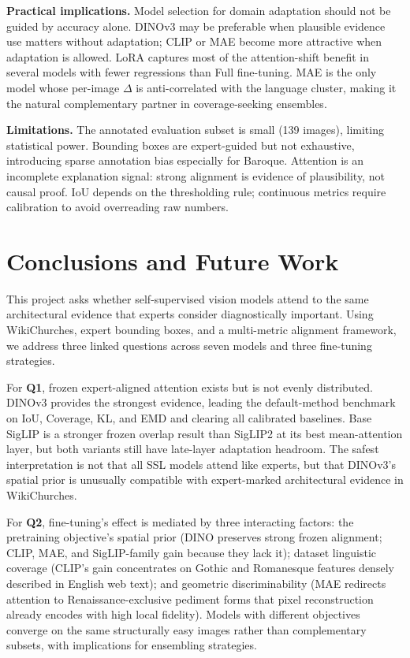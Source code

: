 \documentclass{article}
\begin{document}
\textbf{Practical implications.} Model selection for domain adaptation should
not be guided by accuracy alone. DINOv3 may be preferable when plausible
evidence use matters without adaptation; CLIP or MAE become more attractive when
adaptation is allowed. LoRA captures most of the attention-shift benefit in
several models with fewer regressions than Full fine-tuning. MAE is the only
model whose per-image $\Delta$ is anti-correlated with the language cluster,
making it the natural complementary partner in coverage-seeking ensembles.

\textbf{Limitations.} The annotated evaluation subset is small (139 images),
limiting statistical power. Bounding boxes are expert-guided but not exhaustive,
introducing sparse annotation bias especially for Baroque. Attention is an
incomplete explanation signal: strong alignment is evidence of plausibility, not
causal proof. IoU depends on the thresholding rule; continuous metrics require
calibration to avoid overreading raw numbers.

\section{Conclusions and Future Work}
\label{sec:conc}

This project asks whether self-supervised vision models attend to the same
architectural evidence that experts consider diagnostically important. Using
WikiChurches, expert bounding boxes, and a multi-metric alignment framework, we
address three linked questions across seven models and three fine-tuning
strategies.

For \textbf{Q1}, frozen expert-aligned attention exists but is not evenly
distributed. DINOv3 provides the strongest evidence, leading the default-method
benchmark on IoU, Coverage, KL, and EMD and clearing all calibrated baselines.
Base SigLIP is a stronger frozen overlap result than SigLIP2 at its best
mean-attention layer, but both variants still have late-layer adaptation
headroom. The safest interpretation is not that all SSL models attend like
experts, but that DINOv3's spatial prior is unusually compatible with
expert-marked architectural evidence in WikiChurches.

For \textbf{Q2}, fine-tuning's effect is mediated by three interacting factors:
the pretraining objective's spatial prior (DINO preserves strong frozen
alignment; CLIP, MAE, and SigLIP-family gain because they lack it); dataset
linguistic coverage (CLIP's gain concentrates on Gothic and Romanesque features
densely described in English web text); and geometric discriminability (MAE
redirects attention to Renaissance-exclusive pediment forms that pixel
reconstruction already encodes with high local fidelity). Models with different
objectives converge on the same structurally easy images rather than
complementary subsets, with implications for ensembling strategies.
\end{document}
